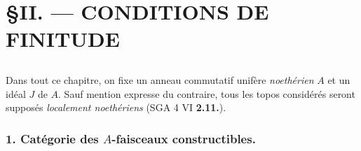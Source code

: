 

\chapter*{\S \space II. --- CONDITIONS DE FINITUDE}
\section*{}

Dans tout ce chapitre, on fixe un anneau commutatif unifère \emph{noethérien} $A$ et un idéal $J$ de $A$. Sauf mention expresse du contraire, tous les topos considérés seront supposés \emph{localement noethériens} (SGA 4 VI {\bf 2.11.}).

\subsection*{1. Catégorie des $A$-faisceaux constructibles.}

